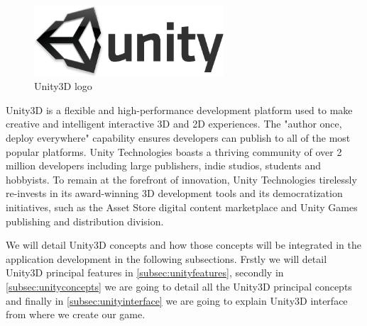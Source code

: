 \begin{figure}[h]
\centering
\includegraphics[width=200pt]{graphics/enabling-tech/unity_logo.png}
\caption{Unity3D logo}
\label{fig:unity_logo}
\end{figure}

Unity3D is a flexible and high-performance development platform used to make creative and intelligent interactive 3D and 2D experiences. The "author once, deploy everywhere" capability ensures developers can publish to all of the most popular platforms. Unity Technologies boasts a thriving community of over 2 million developers including large publishers, indie studios, students and hobbyists. To remain at the forefront of innovation, Unity Technologies tirelessly re-invests in its award-winning 3D development tools and its democratization initiatives, such as the Asset Store digital content marketplace and Unity Games publishing and distribution division.~\cite{unitypress1}

We will detail Unity3D concepts and how those concepts will be integrated in the application development in the following subsections. Frstly we will detail Unity3D principal features in \ref{subsec:unityfeatures}, secondly in \ref{subsec:unityconcepts} we are going to detail all the Unity3D principal concepts and finally in \ref{subsec:unityinterface} we are going to explain Unity3D interface from where we create our game. 

